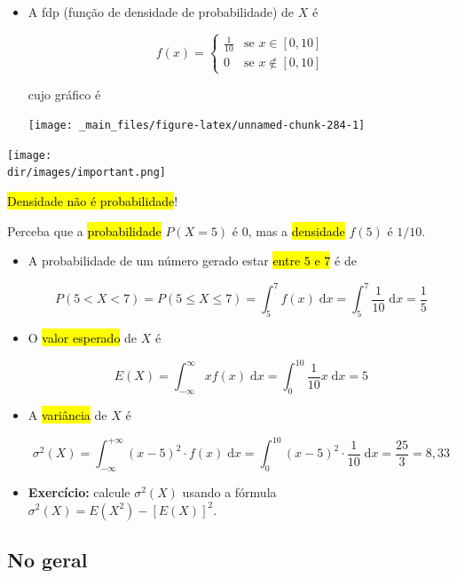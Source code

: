 \documentclass[
  11pt]{report}
\newcommand{\dir}{/ssd/R/x86_64-pc-linux-gnu-library/4.3/fnaufelRmd/rmarkdown/resources}
\newenvironment{rmdimportant}
{
  \begin{myimportant}
    \texttt{[image: \\dir/images/important.png]}
    \tcblower
  }
  {
  \end{myimportant}
}
\begin{document}
\begin{itemize}
\item
  A fdp (função de densidade de probabilidade) de $X$ é

  \[
    f(x) = 
      \begin{cases}
        \frac{1}{10} & \text{se } x \in [0, 10] \\
        0 & \text{se } x \not\in [0, 10]
      \end{cases}
  \]

  cujo gráfico é

  \begin{center}\texttt{[image: \_main\_files/figure-latex/unnamed-chunk-284-1]} \end{center}
\end{itemize}

\begin{rmdimportant}
{\hl{Densidade não é probabilidade}}!

Perceba que a {\hl{probabilidade}} $P(X = 5)$ é $0$, mas a {\hl{densidade}} $f(5)$ é $1/10$.

\end{rmdimportant}

\begin{itemize}
\item
  A probabilidade de um número gerado estar {\hl{entre $5$ e $7$}} é de

  \[
    P(5 < X < 7) = P(5 \leq X \leq 7) = \int_5^7 f(x)\;\text{d}x = \int_5^7 \frac{1}{10}\;\text{d}x = \frac{1}{5}
  \]
\item
  O {\hl{valor esperado}} de $X$ é

  \[
  E(X) = \int_{-\infty}^{\infty} xf(x)\;\text{d}x = \int_{0}^{10} \frac{1}{10}x\;\text{d}x = 5
  \]
\item
  A {\hl{variância}} de $X$ é

  \[
    \sigma^2(X) 
      = \int_{-\infty}^{+ \infty} (x - 5)^2 \cdot f(x)\;\text{d}x 
      = \int_{0}^{10} (x-5)^2 \cdot \frac{1}{10}\;\text{d}x 
      = \frac{25}{3}
      = 8{,}33
  \]
\item
  \textbf{Exercício:} calcule $\sigma^2(X)$ usando a fórmula $\sigma^2(X) = E(X^2) - [E(X)]^2$.
\end{itemize}

\hypertarget{no-geral-6}{%
\subsection{No geral}\label{no-geral-6}}
\end{document}
